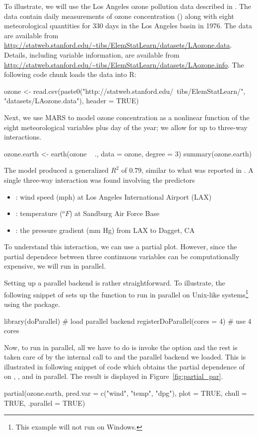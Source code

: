 To illustrate, we will use the Los Angeles ozone pollution data described in \citet{breiman-1985-estimating}. The data contain daily measurements of ozone concentration () along with eight meteorological quantities for 330 days in the Los Angeles basin in 1976. The data are available from \url{http://statweb.stanford.edu/~tibs/ElemStatLearn/datasets/LAozone.data}. Details, including variable information, are available from \url{http://statweb.stanford.edu/~tibs/ElemStatLearn/datasets/LAozone.info}. The following code chunk loads the data into R:
\begin{example}
ozone <- read.csv(paste0("http://statweb.stanford.edu/~tibs/ElemStatLearn/",
                         "datasets/LAozone.data"), header = TRUE)
\end{example}

Next, we use MARS to model ozone concentration as a nonlinear function of the eight meteorological variables plus day of the year; we allow for up to three-way interactions.
\begin{example}
ozone.earth <- earth(ozone ~ ., data = ozone, degree = 3)
summary(ozone.earth)
\end{example}
The model produced a generalized $R^2$ of $0.79$, similar to what was reported in \citet{breiman-1985-estimating}. A single three-way interaction was found involving the predictors
\begin{itemize}
  \item {}: wind speed (mph) at Los Angeles International Airport (LAX)
  \item {}: temperature ($^oF$) at Sandburg Air Force Base
  \item {}: the pressure gradient (mm Hg) from LAX to Dagget, CA
\end{itemize}
To understand this interaction, we can use a partial plot. However, since the partial dependece between three continuous variables can be computationally expensive, we will run  in parallel.

Setting up a parallel backend is rather straightforward. To illustrate, the following snippet of sets up the  function to run in parallel on Unix-like systems\footnote{This example will not run on Windows.} using the  package.
\begin{example}
library(doParallel)  # load parallel backend
registerDoParallel(cores = 4)  # use 4 cores
\end{example}

Now, to run  in parallel, all we have to do is invoke the  option and the rest is taken care of by the internal call to  and the parallel backend we loaded. This is illustrated in following snippet of code which obtains the partial dependence of  on , , and  in parallel. The result is displayed in Figure~\ref{fig:partial_par}.
\begin{example}
partial(ozone.earth, pred.var = c("wind", "temp", "dpg"), plot = TRUE,
        chull = TRUE, .parallel = TRUE)
\end{example}

